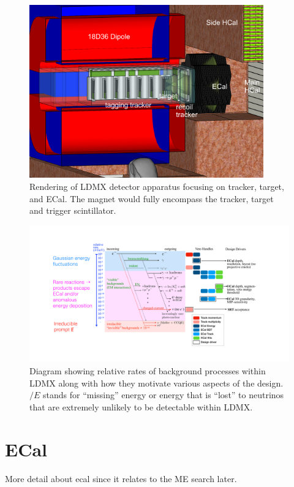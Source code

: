 \begin{figure}
  \centering
  \includegraphics[width=0.9\textwidth]{figures/ldmx/experiment/LDMX_FOA_CLOSE.PNG}
  \caption{
    Rendering of LDMX detector apparatus focusing on tracker, target, and ECal.
    The magnet would fully encompass the tracker, target and trigger scintillator.
  }
  \label{fig:ldmx-render}
\end{figure}

\begin{figure}
  \centering
  \includegraphics[width=\textwidth]{figures/ldmx/experiment/reaction_staircase_with_designDrivers.pdf}
  \caption{
    Diagram showing relative rates of background processes within LDMX along with
    how they motivate various aspects of the design. $\slash{E}$ stands for ``missing''
    energy or energy that is ``lost'' to neutrinos that are extremely unlikely to be
    detectable within LDMX.
  }
  \label{fig:ldmx-bkgd-staircase}
\end{figure}

\section{ECal}
\label{sec:ldmx:ecal}
\begin{todoenv}
More detail about \ac{ecal} since it relates to the ME search later.
\end{todoenv}

